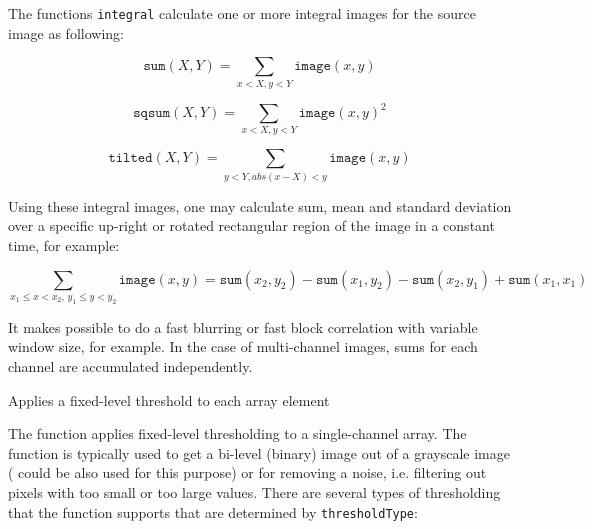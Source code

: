 The functions \texttt{integral} calculate one or more integral images for the source image as following:

\[
\texttt{sum}(X,Y) = \sum_{x<X,y<Y} \texttt{image}(x,y)
\]

\[
\texttt{sqsum}(X,Y) = \sum_{x<X,y<Y} \texttt{image}(x,y)^2
\]

\[
\texttt{tilted}(X,Y) = \sum_{y<Y,abs(x-X)<y} \texttt{image}(x,y)
\]

Using these integral images, one may calculate sum, mean and standard deviation over a specific up-right or rotated rectangular region of the image in a constant time, for example:

\[
\sum_{x_1\leq x < x_2, \, y_1 \leq y < y_2} \texttt{image}(x,y) = \texttt{sum}(x_2,y_2)-\texttt{sum}(x_1,y_2)-\texttt{sum}(x_2,y_1)+\texttt{sum}(x_1,x_1)
\]

It makes possible to do a fast blurring or fast block correlation with variable window size, for example. In the case of multi-channel images, sums for each channel are accumulated independently.


Applies a fixed-level threshold to each array element

\begin{description}
\end{description}

The function applies fixed-level thresholding
to a single-channel array. The function is typically used to get a
bi-level (binary) image out of a grayscale image ( could
be also used for this purpose) or for removing a noise, i.e. filtering
out pixels with too small or too large values. There are several
types of thresholding that the function supports that are determined by
\texttt{thresholdType}:

\begin{description}
\end{description}

